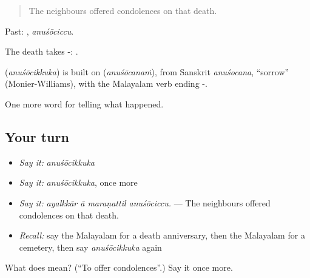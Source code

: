 \begin{quote}
The neighbours offered condolences on that death.
\end{quote}

Past: , \emph{anuśōciccu}.

The death takes -:  .

\begin{cousinweb}
\textbf{} (\emph{anuśōcikkuka}) is built on  (\emph{anuśōcanaṁ}), from Sanskrit \emph{anuśocana}, \textquotedblleft{}sorrow\textquotedblright{} (Monier-Williams), with the Malayalam verb ending -.
\end{cousinweb}

\begin{grammarlens}[title={What you've built}]
One more word for telling what happened.
\end{grammarlens}

\subsection*{Your turn}
\begin{itemize}
\raggedright
  \item \emph{Say it:} \emph{anuśōcikkuka}
  \item \emph{Say it:} \emph{anuśōcikkuka}, once more
  \item \emph{Say it:} \emph{ayalkkār ā maraṇattil anuśōciccu.} — The neighbours offered condolences on that death.
  \item \emph{Recall:} say the Malayalam for a death anniversary, then the Malayalam for a cemetery, then say \emph{anuśōcikkuka} again
\end{itemize}

\begin{tcolorbox}[breakable,colback=teal!4,colframe=teal!35!black,title={Before you move on}]
What does  mean? (\textquotedblleft{}To offer condolences\textquotedblright{}.) Say it once more.
\end{tcolorbox}
